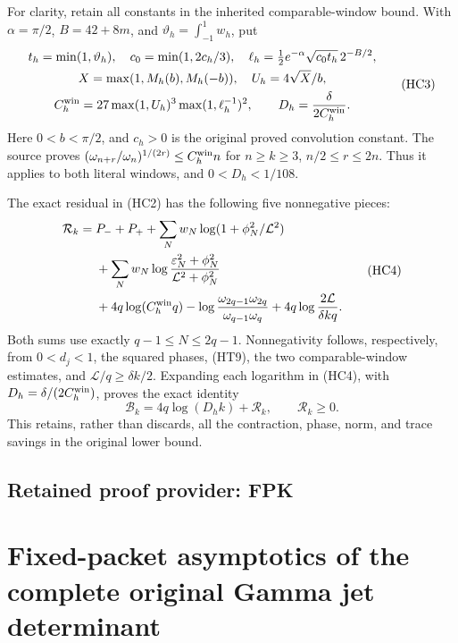 \documentclass[11pt,a4paper]{article}
\begin{document}
For clarity, retain all constants in the inherited comparable-window
bound.  With $\alpha=\pi/2$, $B=42+8m$, and
$\vartheta_h=\int_{-1}^{1}w_h$, put
\[
 \begin{gathered}
 t_h=\min(1,\vartheta_h),\quad c_0=\min(1,2c_h/3),\quad
 \ell_h=\tfrac12 e^{-\alpha}\sqrt{c_0t_h}\,2^{-B/2},\\
 X=\max(1,M_h(b),M_h(-b)),\quad U_h=4\sqrt X/b,\\
 C_h^{\rm win}=27\max(1,U_h)^3\max(1,\ell_h^{-1})^2,
 \qquad D_h=\frac{\delta}{2C_h^{\rm win}}.
 \end{gathered}\tag{HC3}
\]
Here $0<b<\pi/2$, and $c_h>0$ is the original proved convolution
constant.  The source proves
$(\omega_{n+r}/\omega_n)^{1/(2r)}\leq C_h^{\rm win}n$ for
$n\geq k\geq3$, $n/2\leq r\leq2n$.  Thus it applies to both literal
windows, and $0<D_h<1/108$.

The exact residual in (HC2) has the following five nonnegative pieces:
\[
 \begin{split}
 \mathcal R_k={}&P_-+P_+
 +\sum_Nw_N\log(1+\phi_N^2/\mathcal L^2)\\
 &+\sum_Nw_N\log\frac{\varepsilon_N^2+\phi_N^2}
                              {\mathcal L^2+\phi_N^2}\\
 &+4q\log(C_h^{\rm win}q)
       -\log\frac{\omega_{2q-1}\omega_{2q}}{\omega_{q-1}\omega_q}
 +4q\log\frac{2\mathcal L}{\delta kq}.
 \end{split}\tag{HC4}
\]
Both sums use exactly $q-1\leq N\leq2q-1$.  Nonnegativity follows,
respectively, from $0<d_j<1$, the squared phases, (HT9), the two
comparable-window estimates, and $\mathcal L/q\geq\delta k/2$.
Expanding each logarithm in (HC4), with $D_h=\delta/(2C_h^{\rm win})$,
proves the exact identity
\[
 \boxed{\mathcal B_k=4q\log(D_hk)+\mathcal R_k,
 \qquad\mathcal R_k\geq0.}\tag{HC5}
\]
This retains, rather than discards, all the contraction, phase, norm,
and trace savings in the original lower bound.



\clearpage
\subsection*{Retained proof provider: FPK}

\section{Fixed-packet asymptotics of the complete original Gamma jet determinant}
\label{sec:fixed-gamma-full-jet}
\end{document}
